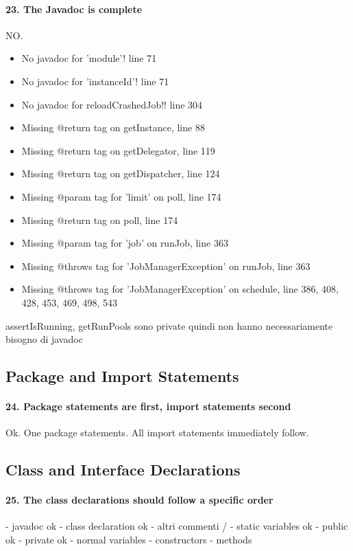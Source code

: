\documentclass[english]{article}
\begin{document}
\paragraph{23. The Javadoc is complete}
NO.
\begin{itemize}
	\item No javadoc for 'module'! line 71
	\item No javadoc for 'instanceId'! line 71
	\item No javadoc for reloadCrashedJob!! line 304
	\item Missing @return tag on getInstance, line 88
	\item Missing @return tag on getDelegator, line 119
	\item Missing @return tag on getDispatcher, line 124
	\item Missing @param tag for 'limit' on poll, line 174
	\item Missing @return tag on poll, line 174
	\item Missing @param tag for 'job' on runJob, line 363
	\item Missing @throws tag for 'JobManagerException' on runJob, line 363
	\item Missing @throws tag for 'JobManagerException' on schedule, line 386, 408, 428, 453, 469, 498, 543
\end{itemize}

assertIsRunning, getRunPools sono private quindi non hanno necessariamente bisogno di javadoc

\subsection{Package and Import Statements}
\paragraph{24. Package statements are first, import statements second}
Ok.
One package statements.
All import statements immediately follow.

\subsection{Class and Interface Declarations}
\paragraph{25. The class declarations should follow a specific order}
- javadoc ok
- class declaration ok
- altri commenti /
- static variables ok
 - public ok
 - private ok
- normal variables 
- constructors
- methods
\end{document}
